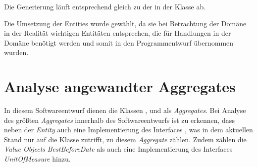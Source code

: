 Die Generierung läuft entsprechend gleich zu der in der Klasse \href{https://github.com/lucasmerkel/dhbw-advancedswe-programmentwurf/blob/5764d7da4cfd0562ed8e96128e92f85c30b7309d/swe_programmentwurf/consumergoods-inventory-planner/3-cip-domain/src/main/java/de/dhbw/cip/domain/Fridge.java}{} ab.

Die Umsetzung der Entities wurde gewählt, da sie bei Betrachtung der Domäne in der Realität wichtigen Entitäten entsprechen, die für Handlungen in der Domäne benötigt werden und somit in den Programmentwurf übernommen wurden.

\section{Analyse angewandter Aggregates}
\label{domaindrivendesign>aggregates}
In diesem Softwareentwurf dienen die Klassen \href{https://github.com/lucasmerkel/dhbw-advancedswe-programmentwurf/blob/5764d7da4cfd0562ed8e96128e92f85c30b7309d/swe_programmentwurf/consumergoods-inventory-planner/3-cip-domain/src/main/java/de/dhbw/cip/domain/ConsumerGoods.java}{}, \href{https://github.com/lucasmerkel/dhbw-advancedswe-programmentwurf/blob/5764d7da4cfd0562ed8e96128e92f85c30b7309d/swe_programmentwurf/consumergoods-inventory-planner/3-cip-domain/src/main/java/de/dhbw/cip/domain/Fridge.java}{} und \href{https://github.com/lucasmerkel/dhbw-advancedswe-programmentwurf/blob/5764d7da4cfd0562ed8e96128e92f85c30b7309d/swe_programmentwurf/consumergoods-inventory-planner/3-cip-domain/src/main/java/de/dhbw/cip/domain/FoodShelf.java}{} als \textit{Aggregates}.
Bei Analyse des größten \textit{Aggregates} innerhalb des Softwareentwurfs ist zu erkennen, dass neben der \textit{Entity} \href{https://github.com/lucasmerkel/dhbw-advancedswe-programmentwurf/blob/5764d7da4cfd0562ed8e96128e92f85c30b7309d/swe_programmentwurf/consumergoods-inventory-planner/3-cip-domain/src/main/java/de/dhbw/cip/domain/ConsumerGoods.java}{} auch eine Implementierung des Interfaces \href{https://github.com/lucasmerkel/dhbw-advancedswe-programmentwurf/blob/5764d7da4cfd0562ed8e96128e92f85c30b7309d/swe_programmentwurf/consumergoods-inventory-planner/3-cip-domain/src/main/java/de/dhbw/cip/domain/StorableGoods.java}{}, was in dem aktuellen Stand nur auf die Klasse \href{https://github.com/lucasmerkel/dhbw-advancedswe-programmentwurf/blob/5764d7da4cfd0562ed8e96128e92f85c30b7309d/swe_programmentwurf/consumergoods-inventory-planner/3-cip-domain/src/main/java/de/dhbw/cip/domain/Food.java}{} zutrifft, zu diesem \textit{Aggregate} zählen. 
Zudem zählen die \textit{Value Objects} \textit{BestBeforeDate} als auch eine Implementierung des Interfaces \textit{UnitOfMeasure} hinzu.

